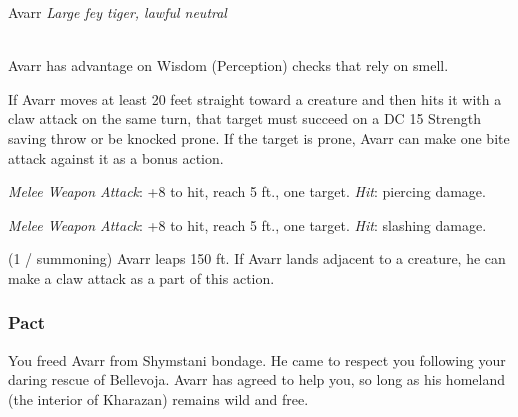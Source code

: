 \documentclass[letterpaper,10pt,twoside,twocolumn,openany]{book}
\begin{document}
\begin{monsterbox}{Avarr}
	\textit{Large fey tiger, lawful neutral}\\
	\hline%
	\basics[%
	armorclass = 13,
	hitpoints  = \dice{7d12 + 18},
	speed      = {50 ft, climb 40 ft, swim 30 ft}
	]
	\hline%
	\stats[
    STR = \stat{20}, %
    DEX = \stat{15},
    CON = \stat{17},
    WIS = \stat{14},
    CHA = \stat{9}
	]
	\hline%
	\details[%
	skills = {Perception +5, Stealth +8},
	senses = {darkvision 60 ft, pp 15},
	languages = {Giant Tiger, understands Common and Sylvan but cannot speak},
	challenge = 2
	]
	\hline \\[1mm]
	\begin{monsteraction}
		Avarr has advantage on Wisdom (Perception) checks that rely on smell.
	\end{monsteraction}
	
	\begin{monsteraction}[Pounce]
		If Avarr moves at least 20 feet straight toward a creature and then hits it with a claw attack on the same turn, 
		that target must succeed on a DC 15 Strength saving throw or be knocked prone. 
		If the target is prone, Avarr can make one bite attack against it as a bonus action.	
	\end{monsteraction}

	\begin{monsteraction}[Bite]
		\emph{Melee Weapon Attack}: +8 to hit, reach 5 ft., one target. \emph{Hit}:  piercing damage.
	\end{monsteraction}

	\begin{monsteraction}[Claw]
		\emph{Melee Weapon Attack}: +8 to hit, reach 5 ft., one target. \emph{Hit}:  slashing damage.
	\end{monsteraction}

	\begin{monsteraction}
		(1 / summoning) Avarr leaps 150 ft. If Avarr lands adjacent to a creature, he can make a claw attack as a part of this action.
	\end{monsteraction}
\end{monsterbox}

\subsubsection{Pact}
You freed Avarr from Shymstani bondage.
He came to respect you following your daring rescue of Bellevoja. 
Avarr has agreed to help you, so long as his homeland (the interior of Kharazan) remains wild and free.
\end{document}
